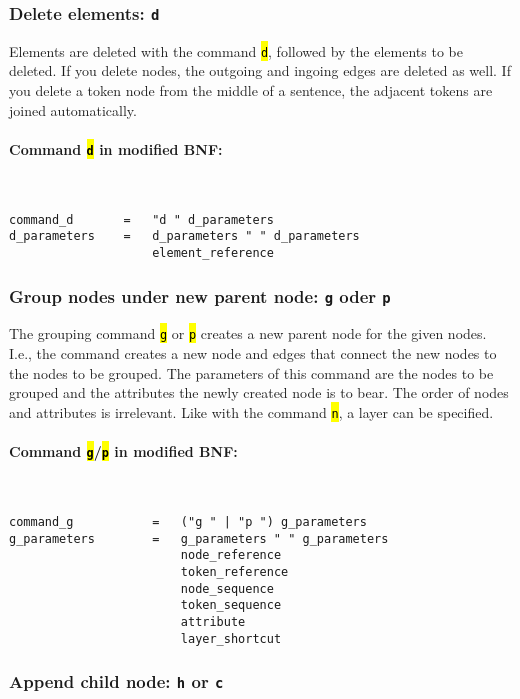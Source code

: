 \documentclass[12pt]{scrartcl}
\newcommand{\code}[1]{\hl{\texttt{#1}}}
\begin{document}
\subsubsection{Delete elements: \texttt{d}}

Elements are deleted with the command \code{d}, followed by the elements to be deleted.
If you delete nodes, the outgoing and ingoing edges are deleted as well.
If you delete a token node from the middle of a sentence, the adjacent tokens are joined automatically.

\paragraph*{Command \code{d} in modified BNF:}
~
\begin{lstlisting}
command_d       =   "d " d_parameters
d_parameters    =   d_parameters " " d_parameters
                    element_reference
\end{lstlisting}


\subsubsection{Group nodes under new parent node: \texttt{g} oder \texttt{p}}

The grouping command \code{g} or \code{p} creates a new parent node for the given nodes.
I.e., the command creates a new node and edges that connect the new nodes to the nodes to be grouped.
The parameters of this command are the nodes to be grouped and the attributes the newly created node is to bear.
The order of nodes and attributes is irrelevant.
Like with the command \code{n}, a layer can be specified.

\paragraph*{Command \code{g}/\code{p} in modified BNF:}
~
\begin{lstlisting}
command_g           =   ("g " | "p ") g_parameters
g_parameters        =   g_parameters " " g_parameters
                        node_reference
                        token_reference
                        node_sequence
                        token_sequence
                        attribute
                        layer_shortcut
\end{lstlisting}


\subsubsection{Append child node: \texttt{h} or \texttt{c}}
\end{document}
